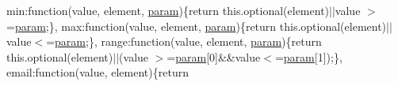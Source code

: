 \begin{DoxyCompactItemize}
min\+:function(value, element, \hyperlink{_scripts_2jquery-1_810_82_8min_8js_ae8915303d11557d1b001bc56b6195251}{param})\{return this.\+optional(element)$\vert$$\vert$value $>$=\hyperlink{_scripts_2jquery-1_810_82_8min_8js_ae8915303d11557d1b001bc56b6195251}{param};\}, max\+:function(value, element, \hyperlink{_scripts_2jquery-1_810_82_8min_8js_ae8915303d11557d1b001bc56b6195251}{param})\{return this.\+optional(element)$\vert$$\vert$value$<$=\hyperlink{_scripts_2jquery-1_810_82_8min_8js_ae8915303d11557d1b001bc56b6195251}{param};\}, range\+:function(value, element, \hyperlink{_scripts_2jquery-1_810_82_8min_8js_ae8915303d11557d1b001bc56b6195251}{param})\{return this.\+optional(element)$\vert$$\vert$(value $>$=\hyperlink{_scripts_2jquery-1_810_82_8min_8js_ae8915303d11557d1b001bc56b6195251}{param}\mbox{[}0\mbox{]}\&\&value$<$=\hyperlink{_scripts_2jquery-1_810_82_8min_8js_ae8915303d11557d1b001bc56b6195251}{param}\mbox{[}1\mbox{]});\}, email\+:function(value, element)\{return 
\end{DoxyCompactItemize}
